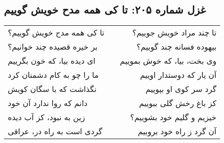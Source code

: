\begin{center}
\section*{غزل شماره ۲۰۵: تا کی همه مدح خویش گوییم}
\label{sec:205}
\begin{longtable}{l p{0.5cm} r}
تا کی همه مدح خویش گوییم؟
&&
تا چند مراد خویش جوییم؟
\\
بر خیره قصیده چند خوانیم؟
&&
بیهوده فسانه چند گوییم؟
\\
ای دیده بیا، که خون بگرییم
&&
وی بخت، بیا، که خوش بموییم
\\
ما را چو به کام دشمنان کرد
&&
آن یار که دوستدار اوییم
\\
نگذاشت که با سگان کویش
&&
گرد سر کوی او بپوییم
\\
دانم که روا ندارد آن خود
&&
کز باغ رخش گلی ببوییم
\\
زین به نبود، کز آب دیده
&&
خیزیم و گلیم خود بشوییم؟
\\
گردی است به راه در، عراقی
&&
آن گرد ز راه خود بروبیم
\\
\end{longtable}
\end{center}
